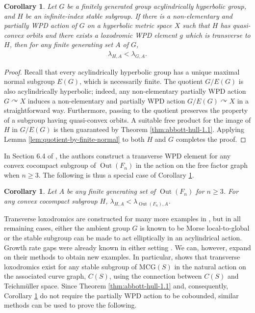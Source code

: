 \documentclass[11pt,letterpaper]{amsart}
\newtheorem{corollary}[theorem]{Corollary}
\theoremstyle{definition}
\theoremstyle{plain}
\theoremstyle{TheoremNum}
\DeclareMathOperator{\Out}{\mathrm{Out}}
\begin{document}
\begin{corollary}\label{cor:trans-lox-growth-gap}
    Let $G$ be a finitely generated group acylindrically hyperbolic group, and $H$ be an infinite-index stable subgroup. If there is a non-elementary and partially WPD action of $G$ on a hyperbolic metric space $X$ such that $H$ has quasi-convex orbits and there exists a loxodromic WPD element $g$ which is transverse to $H$, then for any finite generating set $A$ of $G$,
    \begin{align*}
        \lambda_{H,A} < \lambda_{G, A}\text{.}
    \end{align*}
\end{corollary}
\begin{proof}
     Recall that every acylindrically hyperbolic group has a unique maximal normal subgroup $E(G)$, which is necessarily finite. The quotient $G/E(G)$ is also acylindrically hyperbolic; indeed, any non-elementary partially WPD action $G \curvearrowright X$ induces a non-elementary and partially WPD action $G/E(G) \curvearrowright X$ in a straightforward way. Furthermore, passing to the quotient preserves the property of a subgroup having quasi-convex orbits. A suitable free product for the image of $H$ in $G/E(G)$ is then guaranteed by Theorem \ref{thm:abbott-hull-1.1}. Applying Lemma \ref{lem:quotient-by-finite-normal} to both $H$ and $G$ completes the proof. 
\end{proof}
In Section 6.4 of \cite{Abbott-Hull}, the authors construct a transverse WPD element for any convex cocompact subgroup of $\Out(F_n)$ in the action on the free factor graph when $n \geq 3$. The following is thus a special case of Corollary \ref{cor:trans-lox-growth-gap}.
\begin{corollary}
    Let $A$ be any finite generating set of $\Out(F_n)$ for $n \geq 3$. For any convex cocompact subgroup $H$, $\lambda_{H,A} < \lambda_{\Out(F_n), A}$.
\end{corollary}

Transverse loxodromics are constructed for many more examples in \cite{Abbott-Hull}, but in all remaining cases, either the ambient group $G$ is known to be Morse local-to-global or the stable subgroup can be made to act elliptically in an acylindrical action. Growth rate gaps were already known in either setting \cite{CRSZ,DFW}. We can, however, expand on their methods to obtain new examples. In particular, \cite[Proposition~6.9]{Abbott-Hull} shows that transverse loxodromics exist for any stable subgroup of $\mathrm{MCG}(S)$ in the natural action on the associated curve graph, $C(S)$, using the connection between $C(S)$ and Teichm\"{u}ller space. Since Theorem \ref{thm:abbott-hull-1.1} and, consequently, Corollary \ref{cor:trans-lox-growth-gap} do not require the partially WPD action to be cobounded, similar methods can be used to prove the following.
\end{document}
